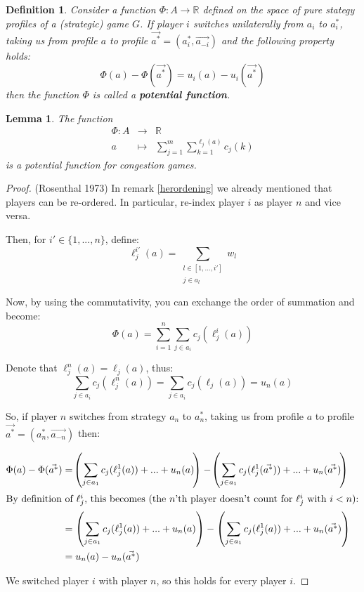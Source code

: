 \documentclass[a4paper,11pt]{article}
\newtheorem{lemma}[theorem]{Lemma}
\newtheorem{definition}[theorem]{Definition}
\newcommand{\R}{{\mathbb R}}
\begin{document}
\begin{definition}
Consider a function $\Phi: A \rightarrow \R$  defined on the space of pure stategy profiles of a (strategic) game $G$. If player $i$ switches unilaterally from $a_i$ to $a_i^*$, taking us from profile $a$ to profile $\vec{a^*}=(a_i^*, \vec{a_{-i}})$ and the following property holds:
$$\Phi(a) - \Phi(\vec{a^*}) = u_i(a) - u_i(\vec{a^*}) $$
then the function $\Phi$ is called a \textbf{potential function}.
\end{definition}



\begin{lemma}
The function
\begin{eqnarray*}
\Phi: A &\rightarrow& \R\\
a &\mapsto& \displaystyle\sum_{j=1}^{m}\displaystyle\sum_{k=1}^{\ell_j(a)} c_j(k)
\end{eqnarray*}
is a potential function for congestion games.
\end{lemma}

\begin{proof}(Rosenthal 1973)\cite{7,8}
In remark \ref{herordening} we already mentioned that players can be re-ordered. In particular, re-index player $i$ as player $n$ and vice versa.

Then, for $i' \in \{1,...,n\}$, define:
$$\ell_j^{i'}(a) = \displaystyle\sum_{\substack{l \in [1,...,i']\\j \in a_l}}{w_l} $$

Now, by using the commutativity, you can exchange the order of summation and become:
$$\Phi(a) = \displaystyle\sum_{i=1}^{n}\displaystyle\sum_{j\in a_i} c_j(\ell_j^i(a))$$

Denote that $\ell_j^n(a) = \ell_j(a)$, thus:
$$\displaystyle\sum_{j\in a_i} c_j(\ell_j^n(a)) = \displaystyle\sum_{j\in a_i} c_j(\ell_j(a)) = u_n(a)$$

So, if player $n$ switches from strategy $a_n$ to $a_n^*$, taking us from profile $a$ to profile $\vec{a^*}=(a_n^*, \vec{a_{-n}})$ then:

\begin{align*}
\Phi(a) - \Phi(\vec{a^*}) &= \!\left(\sum_{j\in a_1} c_j(\ell_j^1(a)) + ... + u_n(a) \!\right) - \!\left(\sum_{j\in a_1} c_j(\ell_j^1(\vec{a^*})) + ... + u_n(\vec{a^*}) \!\right)\\
\intertext{By definition of $\ell_j^i$, this becomes (the $n$'th player doesn't count for $\ell_j^i$ with $i < n$):}
&= \left(\sum_{j\in a_1} c_j(\ell_j^1(a)) + ... + u_n(a) \right) - \left(\sum_{j\in a_1} c_j(\ell_j^1(a)) + ... + u_n(\vec{a^*}) \right)\\
&= u_n(a) - u_n(\vec{a^*})
\end{align*}

We switched player $i$ with player $n$, so this holds for every player $i$.

\end{proof}
\end{document}
